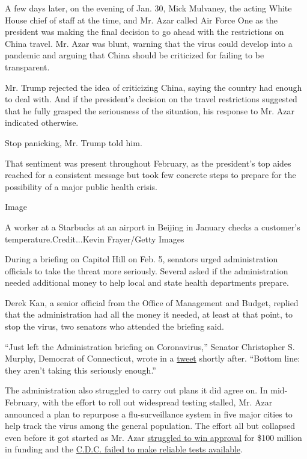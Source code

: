 A few days later, on the evening of Jan. 30, Mick Mulvaney, the acting
White House chief of staff at the time, and Mr. Azar called Air Force
One as the president was making the final decision to go ahead with the
restrictions on China travel. Mr. Azar was blunt, warning that the virus
could develop into a pandemic and arguing that China should be
criticized for failing to be transparent.

Mr. Trump rejected the idea of criticizing China, saying the country had
enough to deal with. And if the president's decision on the travel
restrictions suggested that he fully grasped the seriousness of the
situation, his response to Mr. Azar indicated otherwise.

Stop panicking, Mr. Trump told him.

That sentiment was present throughout February, as the president's top
aides reached for a consistent message but took few concrete steps to
prepare for the possibility of a major public health crisis.

Image

A worker at a Starbucks at an airport in Beijing in January checks a
customer's temperature.Credit...Kevin Frayer/Getty Images

During a briefing on Capitol Hill on Feb. 5, senators urged
administration officials to take the threat more seriously. Several
asked if the administration needed additional money to help local and
state health departments prepare.

Derek Kan, a senior official from the Office of Management and Budget,
replied that the administration had all the money it needed, at least at
that point, to stop the virus, two senators who attended the briefing
said.

``Just left the Administration briefing on Coronavirus,'' Senator
Christopher S. Murphy, Democrat of Connecticut, wrote in a
\href{https://twitter.com/chrismurphyct/status/1225073987639705600?lang=en}{tweet}
shortly after. ``Bottom line: they aren't taking this seriously
enough.''

The administration also struggled to carry out plans it did agree on. In
mid-February, with the effort to roll out widespread testing stalled,
Mr. Azar announced a plan to repurpose a flu-surveillance system in five
major cities to help track the virus among the general population. The
effort all but collapsed even before it got started as Mr. Azar
\href{https://int.nyt.com/data/documenthelper/6873-2020-02-14-cdc-surveillance-fu/51b5187c0fd8b4698a50/optimized/full.pdf\#page=1}{struggled
to win approval} for \$100 million in funding and the
\href{https://www.nytimes.com/2020/03/10/us/coronavirus-testing-delays.html}{C.D.C.
failed to make reliable tests available}.


